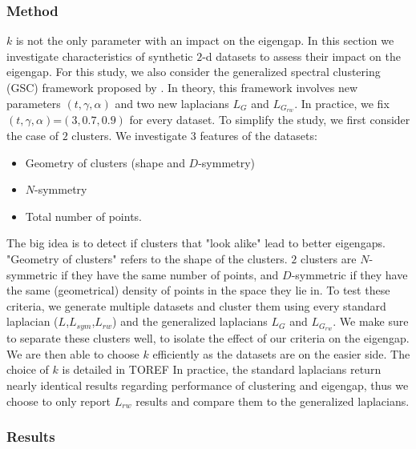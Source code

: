 \documentclass[a4paper,12pt]{article}
\theoremstyle{definition}
\theoremstyle{plain}
\begin{document}
\subsubsection{Method}
$k$ is not the only parameter with an impact on the eigengap. In this section we investigate characteristics of synthetic $2$-d datasets to assess their impact on the eigengap. For this study, we also consider the generalized spectral clustering (GSC) framework proposed by \cite[Jonckheere et.al]{GSC}. In theory, this framework involves new parameters $(t,\gamma,\alpha)$ and two new laplacians $L_{G}$ and $L_{G_{rw}}$. In practice, we fix $(t,\gamma,\alpha)$=$(3,0.7,0.9)$ for every dataset. To simplify the study, we first consider the case of $2$ clusters. We investigate $3$ features of the datasets:
\begin{itemize}
	\item Geometry of clusters (shape and $D$-symmetry)
	\item $N$-symmetry
	\item Total number of points.
\end{itemize}
The big idea is to detect if clusters that "look alike" lead to better eigengaps. 
"Geometry of clusters" refers to the shape of the clusters. $2$ clusters are $N$-symmetric if they have the same number of points, and $D$-symmetric if they have the same (geometrical) density of points in the space they lie in.
To test these criteria, we generate multiple datasets and cluster them using every standard laplacian ($L$,$L_{sym}$,$L_{rw}$) and the generalized laplacians $L_G$ and $L_{G_{rw}}$. We make sure to separate these clusters well, to isolate the effect of our criteria on the eigengap. We are then able to choose $k$ efficiently as the datasets are on the easier side. The choice of $k$ is detailed in TOREF In practice, the standard laplacians return nearly identical results regarding performance of clustering and eigengap, thus we choose to only report $L_{rw}$ results and compare them to the generalized laplacians.
\subsubsection{Results}
\end{document}
